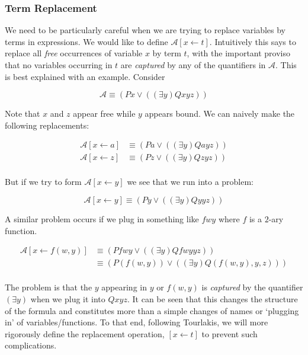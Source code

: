 \documentclass[12pt]{article}
\newcommand{\mc}[1]{\mathcal{#1}}
\begin{document}
\subsubsection*{Term Replacement}

We need to be particularly careful when we are trying to replace variables by terms in expressions. We would like to define $\mc{A}[x \leftarrow t]$. Intuitively this says to replace all \textit{free} occurrences of variable $x$ by term $t$, with the important proviso that no variables occurring in $t$ are \textit{captured} by any of the quantifiers in $\mc{A}$. This is best explained with an example. Consider

$$
\mc{A} \equiv (Px \lor ((\exists y)Qxyz))
$$

Note that $x$ and $z$ appear free while $y$ appears bound.
We can naively make the following replacements:

\begin{equation}
\begin{split}
\mc{A}[x\leftarrow a] &\equiv (Pa \lor ((\exists y)Qayz))\\
\mc{A}[x\leftarrow z] &\equiv (Pz \lor ((\exists y)Qzyz))\\
\end{split}
\end{equation}

But if we try to form $\mc{A}[x\leftarrow y]$ we see that we run into a problem:

\begin{equation}
\mc{A}[x\leftarrow y] \equiv (Py \lor ((\exists y)Qyyz))
\end{equation}

A similar problem occurs if we plug in something like $fwy$ where $f$ is a $2$-ary function.

\begin{equation}
\begin{split}
\mc{A}[x\leftarrow f(w,y)] &\equiv (Pfwy \lor ((\exists y)Qfwyyz))\\
&\equiv (P(f(w,y)) \lor ((\exists y)Q(f(w,y),y,z)))\\
\end{split}
\end{equation}

The problem is that the $y$ appearing in $y$ or $f(w,y)$ is \textit{captured} by the quantifier $(\exists y)$ when we plug it into $Qxyz$. It can be seen that this changes the structure of the formula and constitutes more than a simple changes of names or `plugging in' of variables/functions. To that end, following Tourlakis, we will more rigorously define the replacement operation, $[x\leftarrow t]$ to prevent such complications.
\end{document}
